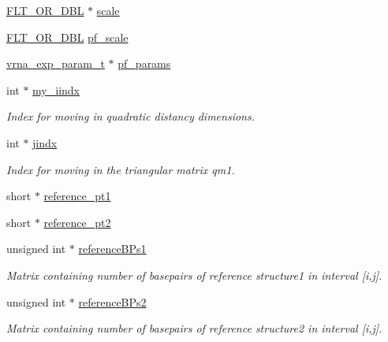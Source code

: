 \begin{DoxyCompactItemize}
\item 
\mbox{\hyperlink{group__data__structures_ga31125aeace516926bf7f251f759b6126}{F\+L\+T\+\_\+\+O\+R\+\_\+\+D\+BL}} $\ast$ \mbox{\hyperlink{struct_two_dpfold__vars_a87c8a08af2acb04d134989ee5126a3ad}{scale}}
\item 
\mbox{\hyperlink{group__data__structures_ga31125aeace516926bf7f251f759b6126}{F\+L\+T\+\_\+\+O\+R\+\_\+\+D\+BL}} \mbox{\hyperlink{struct_two_dpfold__vars_a0f67701d0a2bc9253dce725261187a03}{pf\+\_\+scale}}
\item 
\mbox{\hyperlink{group__energy__parameters_ga01d8b92fe734df8d79a6169482c7d8d8}{vrna\+\_\+exp\+\_\+param\+\_\+t}} $\ast$ \mbox{\hyperlink{struct_two_dpfold__vars_a6158d3c08cfeecb84783ee2c30791808}{pf\+\_\+params}}
\item 
int $\ast$ \mbox{\hyperlink{struct_two_dpfold__vars_ac2d3e6abf0cb0e1df363904fc938076e}{my\+\_\+iindx}}
\begin{DoxyCompactList}\small\item\em Index for moving in quadratic distancy dimensions. \end{DoxyCompactList}\item 
int $\ast$ \mbox{\hyperlink{struct_two_dpfold__vars_a0699e194a797532c91b284ab10272384}{jindx}}
\begin{DoxyCompactList}\small\item\em Index for moving in the triangular matrix qm1. \end{DoxyCompactList}\item 
short $\ast$ \mbox{\hyperlink{struct_two_dpfold__vars_af4c968cf0ebecfc45ce5b0c702343ff0}{reference\+\_\+pt1}}
\item 
short $\ast$ \mbox{\hyperlink{struct_two_dpfold__vars_a3f2294a6aedd68ebea47581145ffd29a}{reference\+\_\+pt2}}
\item 
unsigned int $\ast$ \mbox{\hyperlink{struct_two_dpfold__vars_aea15706d27b6b0fc19f5773919f43a8a}{reference\+B\+Ps1}}
\begin{DoxyCompactList}\small\item\em Matrix containing number of basepairs of reference structure1 in interval \mbox{[}i,j\mbox{]}. \end{DoxyCompactList}\item 
unsigned int $\ast$ \mbox{\hyperlink{struct_two_dpfold__vars_a1221396d712bf76b7f35297f2ab35a9f}{reference\+B\+Ps2}}
\begin{DoxyCompactList}\small\item\em Matrix containing number of basepairs of reference structure2 in interval \mbox{[}i,j\mbox{]}. \end{DoxyCompactList}\item 

\end{DoxyCompactItemize}
